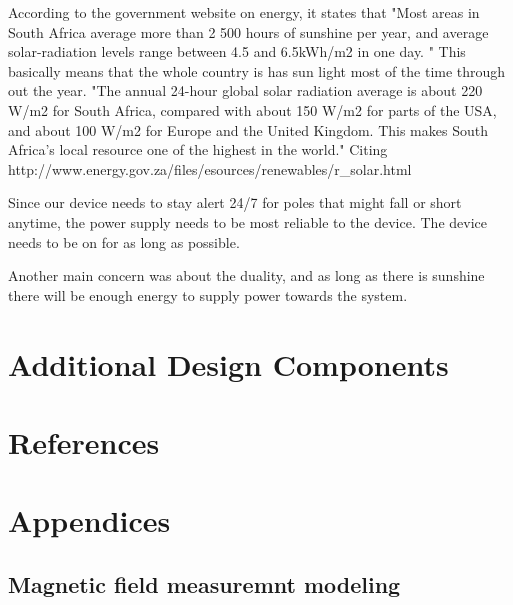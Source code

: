 \documentclass[12pt]{article}
\begin{document}
According to the government website on energy, it states that "Most areas in South Africa average more than 2 500 hours of sunshine per year, and average solar-radiation levels range between 4.5 and 6.5kWh/m2 in one day. " This basically means that the whole country is has sun light most of the time through out the year. "The annual 24-hour global solar radiation average is about 220 W/m2 for South Africa, compared with about 150 W/m2 for parts of the USA, and about 100 W/m2 for Europe and the United Kingdom. This makes South Africa's local resource one of the highest in the world." Citing http://www.energy.gov.za/files/esources/renewables/r_solar.html

Since our device needs to stay alert 24/7 for poles that might fall or short anytime, the power supply needs to be most reliable to the device. The device needs to be on for as long as possible. 

Another main concern was about the duality, and as long as there is sunshine there will be enough energy to supply power towards the system.  

\section{Additional Design Components}

\section{References}

\section{Appendices}
\subsection{Magnetic field measuremnt modeling}
\end{document}
